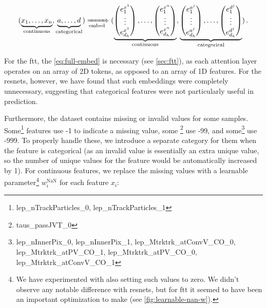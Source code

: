\begin{equation}
    \label{eq:full-embed}
    (\underbrace{x_1, \dots, x_n}_\text{continuous},
    \underbrace{a, \dots, d}_\text{categorical})
    \xRightarrow[\text{embed}]{}
    (\underbrace{\begin{pmatrix}
            e^{x^1}_1 \\ \vdots \\ e^{x^1}_{d_h}
        \end{pmatrix}, \dots,
        \begin{pmatrix}
            e^{x^n}_1 \\ \vdots \\ e^{x^n}_{d_h}
        \end{pmatrix}}_\text{continuous},
    \underbrace{\begin{pmatrix}
            e^{a^j}_1 \\ \vdots \\ e^{a^j}_{d_h}
        \end{pmatrix}, \dots,
        \begin{pmatrix}
            e^{d^j}_1 \\ \vdots \\ e^{d^j}_{d_h}
        \end{pmatrix}}_\text{categorical})\,.
\end{equation}

For the \gls{ftt}, the \autoref{eq:full-embed} is necessary (see \autoref{sec:ftt}), as each attention layer operates
on an array of 2D tokens, as opposed to an array of 1D features. For the \glspl{resnet}, however, we have found that
such embeddings were completely unnecessary, suggesting that categorical features were not particularly useful in
prediction.

Furthermore, the dataset contains missing or invalid values for some samples.  Some\footnote{lep\_nTrackParticles\_0,
    lep\_nTrackParticles\_1} features use -1 to indicate a missing value, some \footnote{taus\_passJVT\_0} use -99, and
some\footnote{lep\_nInnerPix\_0, lep\_nInnerPix\_1, lep\_Mtrktrk\_atConvV\_CO\_0, lep\_Mtrktrk\_atPV\_CO\_1,
    lep\_Mtrktrk\_atPV\_CO\_0, lep\_Mtrktrk\_atConvV\_CO\_1} use -999. To properly handle these, we introduce a separate
category for them when the feature is categorical (as an invalid value is essentially an extra unique value, so the
number of unique values for the feature would be automatically increased by 1). For continuous features, we replace the
missing values with a learnable parameter\footnote{We have experimented with also setting such values to zero. We didn't
    observe any notable difference with \glspl{resnet}, but for \gls{ftt} it seemed to have been an important
    optimization to make (see \autoref{fig:learnable-nan-w}).} $w^\text{NaN}_i$ for each feature $x_i$:

